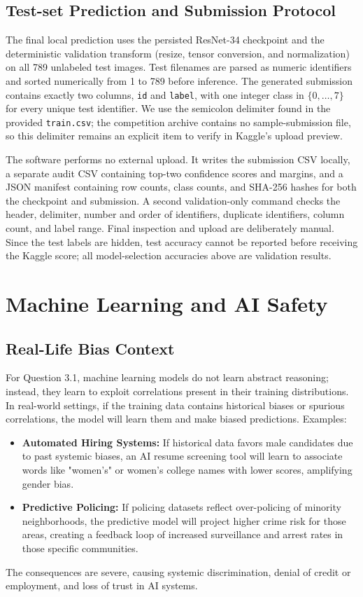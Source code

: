 \documentclass{name}
\begin{document}
\subsection{Test-set Prediction and Submission Protocol}
The final local prediction uses the persisted ResNet-34 checkpoint and the deterministic validation transform (resize, tensor conversion, and normalization) on all 789 unlabeled test images. Test filenames are parsed as numeric identifiers and sorted numerically from 1 to 789 before inference. The generated submission contains exactly two columns, \texttt{id} and \texttt{label}, with one integer class in $\{0,\ldots,7\}$ for every unique test identifier. We use the semicolon delimiter found in the provided \texttt{train.csv}; the competition archive contains no sample-submission file, so this delimiter remains an explicit item to verify in Kaggle's upload preview.

The software performs no external upload. It writes the submission CSV locally, a separate audit CSV containing top-two confidence scores and margins, and a JSON manifest containing row counts, class counts, and SHA-256 hashes for both the checkpoint and submission. A second validation-only command checks the header, delimiter, number and order of identifiers, duplicate identifiers, column count, and label range. Final inspection and upload are deliberately manual. Since the test labels are hidden, test accuracy cannot be reported before receiving the Kaggle score; all model-selection accuracies above are validation results.

\section{Machine Learning and AI Safety}

\subsection{Real-Life Bias Context}
For Question 3.1, machine learning models do not learn abstract reasoning; instead, they learn to exploit correlations present in their training distributions. In real-world settings, if the training data contains historical biases or spurious correlations, the model will learn them and make biased predictions.
Examples:
\begin{itemize}
    \item \textbf{Automated Hiring Systems:} If historical data favors male candidates due to past systemic biases, an AI resume screening tool will learn to associate words like "women's" or women's college names with lower scores, amplifying gender bias.
    \item \textbf{Predictive Policing:} If policing datasets reflect over-policing of minority neighborhoods, the predictive model will project higher crime risk for those areas, creating a feedback loop of increased surveillance and arrest rates in those specific communities.
\end{itemize}
The consequences are severe, causing systemic discrimination, denial of credit or employment, and loss of trust in AI systems.
\end{document}
